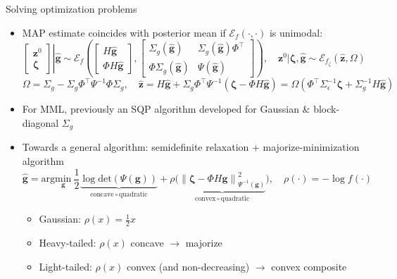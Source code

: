 \documentclass[smaller,aspectratio=169]{beamer}        %
\newcommand{\norm}[1]{\left\lVert#1\right\rVert}
\newcommand{\dett}[1]{\mathrm{det}\left(#1\right)}
\newcommand{\ellip}[1]{\mathcal{E}_f\left(#1\right)}
\begin{document}
\begin{frame}{Solving optimization problems}
    \begin{itemize}
        \item MAP estimate coincides with posterior mean if $\ellip{\cdot,\cdot}$ is unimodal:
        \[\left.\begin{bmatrix}
            \mathbf{z}^0\\\boldsymbol{\zeta}
        \end{bmatrix}\right|\hat{\mathbf{g}}\sim\ellip{\begin{bmatrix}
            H\hat{\mathbf{g}}\\\Phi H\hat{\mathbf{g}}
        \end{bmatrix},\begin{bmatrix}
            \Sigma_g(\hat{\mathbf{g}})&\Sigma_g(\hat{\mathbf{g}})\Phi^\top\\
            \Phi\Sigma_g(\hat{\mathbf{g}})&\Psi(\hat{\mathbf{g}})
        \end{bmatrix}},\quad\mathbf{z}^0|\boldsymbol{\zeta},\hat{\mathbf{g}}\sim\mathcal{E}_{f_\zeta}\left(\hat{\mathbf{z}},\Omega\right)\]
        \[\Omega=\Sigma_g-\Sigma_g\Phi^\top\Psi^{-1}\Phi\Sigma_g,\quad\hat{\mathbf{z}}=H\hat{\mathbf{g}}+\Sigma_g\Phi^\top\Psi^{-1}\left(\boldsymbol{\zeta}-\Phi H\hat{\mathbf{g}}\right)=\Omega\left(\Phi^\top\Sigma_\epsilon^{-1}\boldsymbol{\zeta}+\Sigma_g^{-1}H\hat{\mathbf{g}}\right)\]

        \vspace{0.5em}
        \pause
        \item For MML, previously an SQP algorithm developed for Gaussian \& block-diagonal $\Sigma_g$
        \item \alert{Towards a general algorithm:} semidefinite relaxation + majorize-minimization algorithm
        \[\hat{\mathbf{g}}=\mathrm{arg}\underset{\mathbf{g}}{\mathrm{min}}\ \frac12\underbrace{\log\dett{\Psi(\mathbf{g})}}_{\text{concave}\,\circ\,\text{quadratic}}+\rho\big(\underbrace{\norm{\boldsymbol{\zeta}-\Phi H\mathbf{g}}_{\Psi^{-1}(\mathbf{g})}^2}_{\text{convex}\,\circ\,\text{quadratic}}\big),\quad \rho(\cdot)=-\log f(\cdot)\]

    \vspace{-0.5em}
    \begin{itemize}
        \item Gaussian: $\rho(x)=\frac12 x$
        \item Heavy-tailed: $\rho(x)$ concave $\rightarrow$ majorize
        \item Light-tailed: $\rho(x)$ convex (and non-decreasing) $\rightarrow$ convex composite
    \end{itemize}
    \end{itemize}
\end{frame}
\end{document}
